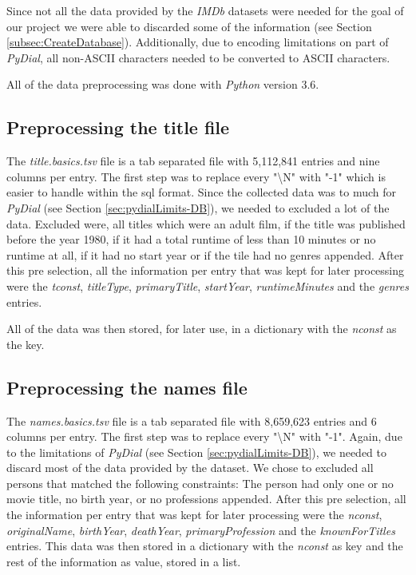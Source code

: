 \documentclass[11pt,a4paper]{article}
\begin{document}
Since not all the data provided by the \emph{IMDb} datasets were needed for the goal of our project we were able to discarded some of the information (see Section \ref{subsec:CreateDatabase}). Additionally, due to encoding limitations on part of \emph{PyDial}, all non-ASCII characters needed to be converted to ASCII characters.

All of the data preprocessing was done with \emph{Python} version 3.6.


	\subsection{Preprocessing the title file}
	\label{sec:preTitle}
	The \emph{title.basics.tsv} file is a tab separated file with 5,112,841 entries and nine columns per entry. The first step was to replace every "\textbackslash N" with "-1" which is easier to handle within the sql format. Since the collected data was to much for \emph{PyDial} (see Section \ref{sec:pydialLimits-DB}), we needed to excluded a lot of the data. Excluded were, all titles which were an adult film, if the title was published before the year 1980, if it had a total runtime of less than 10 minutes or no runtime at all, if it had no start year or if the tile had no genres appended. After this pre selection, all the information per entry that was kept for later processing were the \emph{tconst}, \emph{titleType}, \emph{primaryTitle}, \emph{startYear}, \emph{runtimeMinutes} and the \emph{genres} entries.
	
	All of the data was then stored, for later use, in a dictionary with the \emph{nconst} as the key.
	
	\subsection{Preprocessing the names file}
	\label{sec:preNames}
	The \emph{names.basics.tsv} file is a tab separated file with 8,659,623 entries and 6 columns per entry. The first step was to replace every "\textbackslash N" with "-1". Again, due to the limitations of \emph{PyDial} (see Section \ref{sec:pydialLimits-DB}), we needed to discard most of the data provided by the dataset. We chose to excluded all persons that matched the following constraints: The person had only one or no movie title, no birth year, or no professions appended. After this pre selection, all the information per entry that was kept for later processing were the \emph{nconst}, \emph{originalName}, \emph{birthYear}, \emph{deathYear}, \emph{primaryProfession} and the \emph{knownForTitles} entries. This data was then stored in a dictionary with the \emph{nconst} as key and the rest of the information as value, stored in a list.
	
\end{document}
